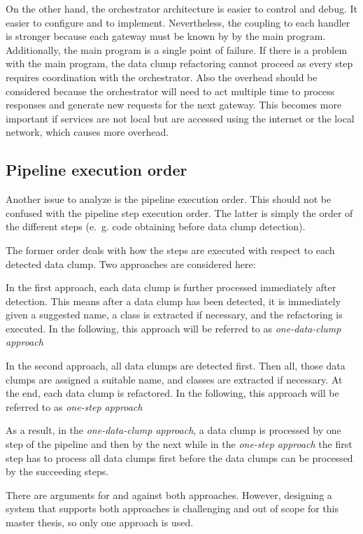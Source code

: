 On the other hand, the orchestrator architecture is easier to control and debug. It easier to configure and to implement. Nevertheless, the coupling to each handler is stronger because each gateway must be known by by the main program. Additionally, the main program is a single point of failure. If there is a problem with the main program, the data clump refactoring cannot proceed as every step requires coordination with the orchestrator. Also the overhead should be considered because the orchestrator will need to act multiple time to process responses and generate new requests for the next gateway. This becomes more important if services are not local but are accessed using the internet or the local network, which causes more overhead. \cite{orchestration_choreography}


\subsection{Pipeline execution order}\label{sec:pipeline_exec_order}

Another issue to analyze is the pipeline execution order. This should not be confused with the pipeline step execution order. The latter is simply the order of the different steps (e.~g. code obtaining before data clump detection). 

The former order deals with how the steps are executed with respect to each detected data clump. Two approaches are considered here:

In the first approach, each data clump is  further processed immediately after detection. This means after a data clump has been detected, it is immediately given a suggested name, a class is extracted if necessary, and the refactoring is executed. In the following, this approach will be referred to as \textit{one-data-clump approach}

In the second approach, all data clumps are detected first. Then all, those data clumps are assigned a suitable name, and classes are extracted if necessary. At the end, each data clump is refactored. In the following, this approach will be referred to as \textit{one-step approach}

As a result, in the \textit{one-data-clump approach}, a data clump is processed by one step of the pipeline and then by the next while in the \textit{one-step approach} the first step has to process all data clumps first before the data clumps can be processed by the succeeding steps.

There are arguments for and against both approaches. However, designing a system that supports both approaches is challenging and out of scope for this master thesis, so only one approach is used. 

